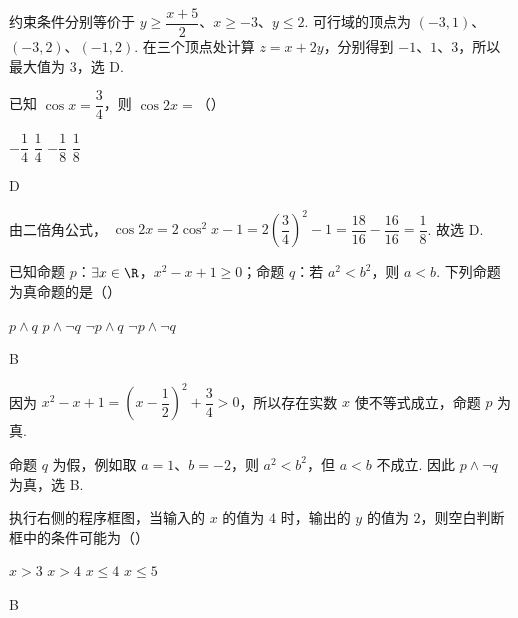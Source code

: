 \begin{solution}
约束条件分别等价于 \(y\geq\dfrac{x+5}{2}\)、\(x\geq-3\)、\(y\leq2\). 可行域的顶点为 \((-3,1)\)、\((-3,2)\)、\((-1,2)\). 在三个顶点处计算 \(z=x+2y\)，分别得到 \(-1\)、\(1\)、\(3\)，所以最大值为 \(3\)，选 D.
\end{solution}

\begin{problem}
已知 \(\cos x=\dfrac34\)，则 \(\cos2x=\)（\quad）

\choices
    {\(-\dfrac14\)}
    {\(\dfrac14\)}
    {\(-\dfrac18\)}
    {\(\dfrac18\)}
\end{problem}

\begin{answer}
D
\end{answer}

\begin{solution}
由二倍角公式，
\(\cos2x=2\cos^2x-1=2\left(\dfrac34\right)^2-1=\dfrac{18}{16}-\dfrac{16}{16}=\dfrac18\). 故选 D.
\end{solution}

\begin{problem}
已知命题 \(p\)：\(\exists x\in\R\)，\(x^2-x+1\ge0\)；命题 \(q\)：若 \(a^2<b^2\)，则 \(a<b\). 下列命题为真命题的是（\quad）

\choices
    {\(p\land q\)}
    {\(p\land \lnot q\)}
    {\(\lnot p\land q\)}
    {\(\lnot p\land \lnot q\)}
\end{problem}

\begin{answer}
B
\end{answer}

\begin{solution}
因为 \(x^2-x+1=\left(x-\dfrac12\right)^2+\dfrac34>0\)，所以存在实数 \(x\) 使不等式成立，命题 \(p\) 为真.

命题 \(q\) 为假，例如取 \(a=1\)、\(b=-2\)，则 \(a^2<b^2\)，但 \(a<b\) 不成立. 因此 \(p\land\lnot q\) 为真，选 B.
\end{solution}

\begin{problem}
执行右侧的程序框图，当输入的 \(x\) 的值为 \(4\) 时，输出的 \(y\) 的值为 \(2\)，则空白判断框中的条件可能为（\quad）


\choices
    {\(x>3\)}
    {\(x>4\)}
    {\(x\le4\)}
    {\(x\le5\)}
\end{problem}

\begin{answer}
B
\end{answer}


